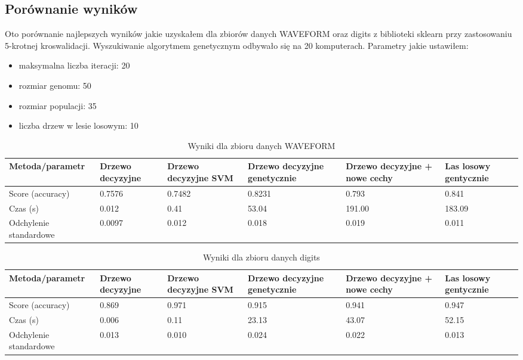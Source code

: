 \documentclass[magisterska]{pracamgr}
\theoremstyle{plain}
\theoremstyle{definition}
\theoremstyle{remark}
\begin{document}
\subsection{Porównanie wyników}
Oto porównanie najlepszych wyników jakie uzyskałem dla zbiorów danych WAVEFORM oraz digits z biblioteki sklearn
przy zastosowaniu 5-krotnej kroswalidacji.
Wyszukiwanie algorytmem genetycznym odbywało się na 20 komputerach. Parametry jakie ustawiłem:
\begin{itemize}
 \item maksymalna liczba iteracji: 20
 \item rozmiar genomu: 50
 \item rozmiar populacji: 35
 \item liczba drzew w lesie losowym: 10
\end{itemize}

\begin{table}
\caption{Wyniki dla zbioru danych WAVEFORM}\label{tab:res_wav}
 \begin{tabular}{l || P{2cm} | P{2cm} | P{2cm} | P{2cm} | P{2cm}}
  Metoda/parametr     & Drzewo decyzyjne & Drzewo decyzyjne SVM & Drzewo decyzyjne genetycznie & Drzewo decyzyjne + nowe cechy & Las losowy gentycznie\\ 
  \hline
  Score (accuracy) & 0.7576     & 0.7482     & 0.8231 & 0.793 & 0.841\\
  \hline
  Czas (s) & 0.012     & 0.41      & 53.04    & 191.00 & 183.09 \\
  \hline
  Odchylenie standardowe & 0.0097     & 0.012      & 0.018    & 0.019 & 0.011 \\
 \end{tabular}
\end{table}

\begin{table}
\caption{Wyniki dla zbioru danych digits}\label{tab:res_dig}
 \begin{tabular}{l || P{2cm} | P{2cm} | P{2cm} | P{2cm} | P{2cm}}
  Metoda/parametr     & Drzewo decyzyjne & Drzewo decyzyjne SVM & Drzewo decyzyjne genetycznie & Drzewo decyzyjne + nowe cechy & Las losowy gentycznie\\ 
  \hline
  Score (accuracy) & 0.869     & 0.971     & 0.915 & 0.941 & 0.947 \\
  \hline
  Czas (s) & 0.006     & 0.11      & 23.13    & 43.07 & 52.15 \\
  \hline
  Odchylenie standardowe & 0.013     & 0.010      & 0.024   & 0.022 & 0.013 \\
 \end{tabular}
\end{table}
\end{document}
